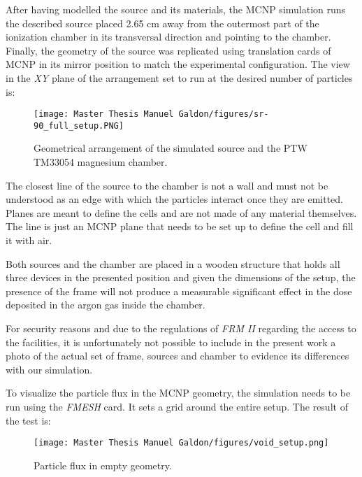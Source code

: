 After having modelled the source and its materials, the MCNP simulation runs the described source placed 2.65 \unit{\centi\meter} away from the outermost part of the ionization chamber in its transversal direction and pointing to the chamber. Finally, the geometry of the source was replicated using translation cards of MCNP in its mirror position to match the experimental configuration. The view in the \emph{XY} plane of the arrangement set to run at the desired number of particles is: 

\begin{figure}[!h]
    \centering
    \texttt{[image: Master Thesis Manuel Galdon/figures/sr-90\_full\_setup.PNG]}
    \caption{Geometrical arrangement of the simulated  source and the PTW TM33054 magnesium chamber.}
    \label{fig:Sr90_full_setup}
\end{figure}

\clearpage
The closest line of the source to the chamber is not a wall and must not be understood as an edge with which the particles interact once they are emitted. Planes are meant to define the cells and are not made of any material themselves. The line is just an MCNP plane that needs to be set up to define the cell and fill it with air. 

Both sources and the chamber are placed in a wooden structure that holds all three devices in the presented position and given the dimensions of the setup, the presence of the frame will not produce a measurable significant effect in the dose deposited in the argon gas inside the chamber. 

For security reasons and due to the regulations of \emph{FRM II} regarding the access to the facilities, it is unfortunately not possible to include in the present work a photo of the actual set of frame, sources and chamber to evidence its differences with our simulation. 

To visualize the particle flux in the MCNP geometry, the simulation needs to be run using the \emph{FMESH} card. It sets a grid around the entire setup. The result of the test is:

\begin{figure}[!h]
    \centering
    \texttt{[image: Master Thesis Manuel Galdon/figures/void\_setup.png]}
    \caption{Particle flux in empty geometry.}
    \label{fig:Particle flux in a void geometry}
\end{figure}

